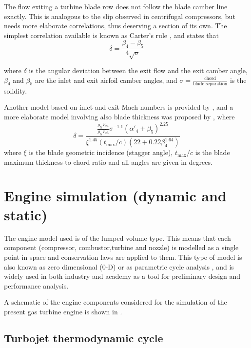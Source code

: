 \documentclass[tcc]{subfiles}
\begin{document}
The flow exiting a turbine blade row does not follow the blade camber line exactly. 
This is analogous to the slip observed in centrifugal compressors, but needs more elaborate correlations, 
thus deserving a section of its own. 
The simplest correlation available is known as Carter's rule \cite{Mattinlgly1995}, and states that
\begin{equation}
    \label{eqn:cartersrule}
    \delta = \frac{\beta_4-\beta_5}{4\sqrt{\sigma}}
\end{equation}

where $\delta$ is the angular deviation between the exit flow and the exit camber angle,
$\beta_4$ and $\beta_5$ are the inlet and exit airfoil camber angles,
and $\sigma=\frac{\text{chord}}{\text{blade separation}}$ is the solidity.

Another model based on inlet and exit Mach numbers is provided by \textcite{Ainley1951}, 
and a more elaborate model involving also blade thickness was proposed by \textcite{Islam1999}, where
\begin{equation}
    \delta = \frac{\frac{\rho_5 V_{x4}}{\rho_5 V_{x5}} \sigma^{-1.1} (\alpha'_4+\beta_5)^{2.25}}
                        {\xi^{1.45} \left(t_{\max}/c\right) \left(22+0.22\beta_4^{1.64}\right)}
\end{equation}
where $\xi$ is the blade geometric incidence (stagger angle), 
$t_{\max}/c$ is the blade maximum thickness-to-chord ratio 
and all angles are given in degrees.


\section{Engine simulation (dynamic and static)}

The engine model used is of the lumped volume type. This means that each component 
 (compressor, combustor,turbine and nozzle)
 is modelled as a single point in space and conservation laws are applied to them.
 This type of model is also known as zero dimensional (0-D) or as parametric cycle analysis
 ,
 and is widely used in both industry and academy as a tool for preliminary design and 
 performance analysis. 

A schematic of the engine components considered for the simulation of the present gas turbine engine is shown in .

\subsection{Turbojet thermodynamic cycle}
\end{document}
